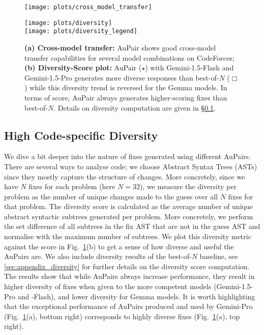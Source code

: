 \documentclass[11pt, a4paper, logo, copyright]{googledeepmind}
\def\aupair/{\textcolor{golden}{Au}Pair}
\def\aupairs/{\textcolor{golden}{Au}Pairs}
\begin{document}
\begin{figure}[t]
    \centering
    \begin{minipage}{0.5\linewidth}
        \texttt{[image: plots/cross\_model\_transfer]}
    \end{minipage}
    \begin{minipage}{0.48\linewidth}
        \texttt{[image: plots/diversity]}\\
        \centering
        \texttt{[image: plots/diversity\_legend]}
    \end{minipage}
    \caption{\textbf{(a) Cross-model transfer:} \aupair/ shows good cross-model transfer capabilities for several model combinations on CodeForces; \textbf{(b) Diversity-Score plot:} \aupair/ ($\star$) with Gemini-1.5-Flash and Gemini-1.5-Pro generates more diverse responses than best-of-$N$ ($\Box$) while this diversity trend is reversed for the Gemma models. In terms of score, \aupair/ always generates higher-scoring fixes than best-of-$N$. Details on diversity computation are given in \S\ref{sec:aupair_analysis_diversity}.}
    \label{fig:cross_model_transfer}
\end{figure}


\subsection{High Code-specific Diversity} 
\label{sec:aupair_analysis_diversity}


We dive a bit deeper into the nature of fixes generated using different \aupairs/. There are several ways to analyse code; we choose Abstract Syntax Trees (ASTs) since they mostly capture the structure of changes. More concretely, since we have $N$ fixes for each problem (here $N = 32$), we measure the diversity per problem as the number of unique changes made to the guess over all $N$ fixes for that problem. The diversity score is calculated as the average number of unique abstract syntactic subtrees generated per problem. More concretely, we perform the set difference of all subtrees in the fix AST that are not in the guess AST and normalise with the maximum number of subtrees.  We plot this diversity metric against the score in Fig.~\ref{fig:cross_model_transfer}(b) to get a sense of how diverse and useful the \aupairs/ are. We also include diversity results of the best-of-$N$ baseline, see \ref{sec:appendix_diversity} for further details on the diversity score computation. The results show that while \aupairs/ always increase performance, they result in higher diversity of fixes when given to the more competent models (Gemini-1.5-Pro and -Flash), and lower diversity for Gemma models. It is worth highlighting that the exceptional performance of \aupairs/ produced and used by Gemini-Pro (Fig.~\ref{fig:cross_model_transfer}(a), bottom right) corresponds to highly diverse fixes (Fig.~\ref{fig:cross_model_transfer}(a), top right).
\end{document}
